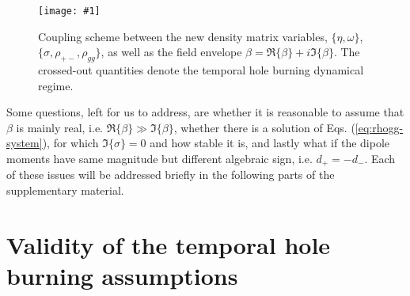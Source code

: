 \documentclass[onecolumn,secnumarabic,amssymb, nobibnotes, aip, prd]{revtex4-1}
\newcommand{\includegraphicsM}[1]{\texttt{[image: \#1]}}
\begin{document}
\begin{figure}[h!]
	\begin{center}
		\includegraphicsM{IMGS/couplingscheme.eps}
		\caption{Coupling scheme between the new density matrix variables, $\{\eta,\omega\}$, $\{\sigma, \rho_{+-},\rho_{gg}\}$, as well as the field envelope $\beta = \Re\{\beta\}+i\Im\{\beta\}$. The crossed-out quantities denote the temporal hole burning dynamical regime.} \label{fig:coupling}
	\end{center}	
\end{figure}

Some questions, left for us to address, are whether it is reasonable to assume that $\beta$ is mainly real, i.e. $\Re\{\beta\} \gg \Im\{\beta\}$, whether there is a solution of Eqs. (\ref{eq:rhogg-system}), for which $\Im\{\sigma\} = 0$ and how stable it is, and lastly what if the dipole moments have same magnitude but different algebraic sign, i.e. $d_+ = -d_-$. Each of these issues will be addressed briefly in the following parts of the supplementary material.  
\section{Validity of the temporal hole burning assumptions}
\label{sec:sup-validity}
\end{document}
